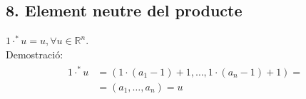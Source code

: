 \documentclass[a4paper, 9pt]{article}
\begin{document}
    \subsection*{8. Element neutre del producte}
        ${1\cdot^*u = u, \forall u \in \mathbb{R}^n}$.\\
        Demostraci\'o:
        \begin{align*}
            \begin{aligned}
                1\cdot^*u &= (1\cdot(a_1-1)+1,\dots,1\cdot(a_n-1)+1) =\\
                          &= (a_1,\dots,a_n) = u
            \end{aligned}
        \end{align*}
\end{document}
